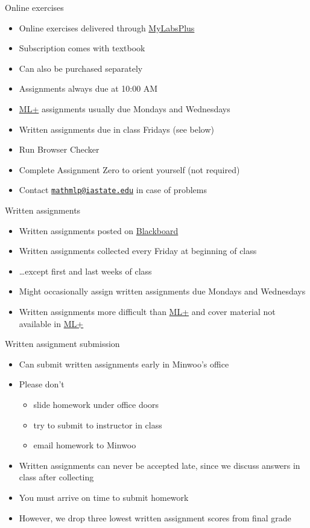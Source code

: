 \documentclass[xcolor=dvipsnames]{beamer}
\theoremstyle{definition}
\begin{document}
\begin{frame}{Online exercises}
\begin{itemize}
\item Online exercises delivered through
\href{http://iastate.mylabsplus.com}{\color{blue} MyLabsPlus}
\item Subscription comes with textbook
\item Can also be purchased separately
\item Assignments always due at 10:00 AM
\item 
\href{http://iastate.mylabsplus.com}{\color{blue}ML+}
assignments usually due Mondays and Wednesdays
\item Written assignments due in class Fridays (see below)
\item Run Browser Checker
\item Complete Assignment Zero to orient yourself (not required)
\item Contact
\href{mailto://mathmlp@iastate.edu}{\color{blue}\tt mathmlp@iastate.edu}
in case of problems
\end{itemize}
\end{frame}

\begin{frame}{Written assignments}
\begin{itemize}
\item Written assignments posted on
\href{https://bb.its.iastate.edu}{\color{blue} Blackboard}
\item Written assignments collected \alert{every Friday}
at \alert{beginning} of class
\item \dots except first and last weeks of class
\item Might occasionally assign written assignments
due Mondays and Wednesdays
\item Written assignments more difficult than 
\href{http://iastate.mylabsplus.com}{\color{blue}ML+}
and cover material not available in
\href{http://iastate.mylabsplus.com}{\color{blue}ML+}
\end{itemize}
\end{frame}

\begin{frame}{Written assignment submission}
\begin{itemize}
\item Can submit written assignments early in Minwoo's office
\item Please don't
\begin{itemize}
\item slide homework under office doors
\item try to submit to instructor in class
\item email homework to Minwoo
\end{itemize}
\item Written assignments can \alert{never} be accepted late,
since we discuss answers in class after collecting
\item You must arrive on time to submit homework
\item However, we drop three lowest written assignment scores from final grade
\end{itemize}
\end{frame}
\end{document}

